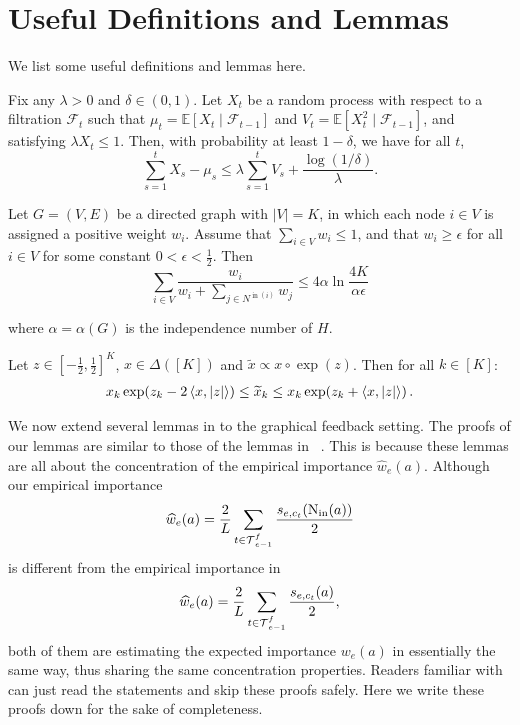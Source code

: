 \section{Useful Definitions and Lemmas}
We list some useful definitions and lemmas here. 

\begin{lemma}  
Fix any \(\lambda>0\) and \(\delta \in(0,1)\). Let \(X_t\) be a random process with respect to a filtration \(\mathcal{F}_t\) such that \(\mu_t = \mathbb{E}\left[X_t \mid \mathcal{F}_{t-1}\right]\) and \(V_t = \mathbb{E}\left[X_t^2 \mid \mathcal{F}_{t-1}\right]\), and satisfying \(\lambda X_t \le 1\). Then, with probability at least \(1-\delta\), we have for all \(t\),  
$$  
\sum_{s=1}^t X_s - \mu_s \le \lambda \sum_{s=1}^t V_s + \frac{\log(1 / \delta)}{\lambda}.  
$$  
\end{lemma}

\begin{lemma}
\label{lem: graph_inverse}
Let $G=(V, E)$ be a directed graph with $|V|=K$, in which each node $i \in V$ is assigned a positive weight $w_i$. Assume that $\sum_{i \in V} w_i \le 1$, and that $w_i \geq \epsilon$ for all $i \in V$ for some constant $0<\epsilon<\frac{1}{2}$. Then
$$
\sum_{i \in V} \frac{w_i}{w_i+\sum_{j \in N^{\operatorname{in}(i)}} w_j} \le 4 \alpha \ln \frac{4 K}{\alpha \epsilon}
$$

where $\alpha=\alpha(G)$ is the independence number of $H$.
\end{lemma}

\begin{lemma}
\label{lem: exp3 update}
Let $z\in[-\frac{1}{2},\frac{1}{2}]^K$, $x\in\Delta([K])$ and $\widetilde x\propto x\circ\exp(z)$. Then for all $k\in[K]$:
\begin{align*}
    x_k \exp(z_k - 2\left\langle x,|z| \right\rangle)\le \widetilde x_k \le x_k \exp(z_k + \left\langle x,|z| \right\rangle)\,.
\end{align*}
\end{lemma}

We now extend several lemmas in \citet{Sch23} to the graphical feedback setting. 
%
The proofs of our lemmas are similar to those of the lemmas in ~\citet{Sch23}.
%
This is because these lemmas are all about the concentration of the empirical importance $\widehat{w}_e(a)$. 
%
Although our empirical importance 
\[\widehat{w}_e(a) = \frac{2}{L} \sum_{t \in \operatorname{\mathcal{T}}_{e-1}^f}  \frac{s_{e,c_t}(\operatorname{N_{\text{in}}}(a))}{2}\] is different from the empirical importance in ~\citet{Sch23} \[\widehat{w}_e(a) =  \frac{2}{L} \sum_{t \in \operatorname{\mathcal{T}}_{e-1}^f}  \frac{s_{e,c_t}(a)}{2},\] both of them are estimating the expected importance $w_e(a)$ in essentially the same way, thus sharing the same concentration properties.
%
Readers familiar with \citet{Sch23} can just read the statements and skip these proofs safely. Here we write these proofs down for the sake of completeness.

